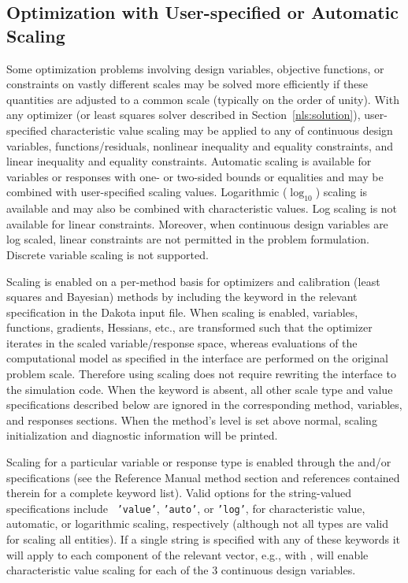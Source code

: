 \subsection{Optimization with User-specified or Automatic Scaling}
\label{opt:additional:scaling}

Some optimization problems involving design variables, objective
functions, or constraints on vastly different scales may be solved
more efficiently if these quantities are adjusted to a common scale
(typically on the order of unity). With any optimizer (or least
squares solver described in Section~\ref{nls:solution}),
user-specified characteristic value scaling may be applied to any of
continuous design variables, functions/residuals, nonlinear inequality
and equality constraints, and linear inequality and equality
constraints. Automatic scaling is available for variables or responses
with one- or two-sided bounds or equalities and may be combined with
user-specified scaling values. Logarithmic ($\log_{10}$) scaling is
available and may also be combined with characteristic values. Log
scaling is not available for linear constraints. Moreover, when
continuous design variables are log scaled, linear constraints are not
permitted in the problem formulation. Discrete variable scaling is not
supported.

Scaling is enabled on a per-method basis for optimizers and
calibration (least squares and Bayesian) methods by including the
 keyword in the relevant 
specification in the Dakota input file. When scaling is enabled,
variables, functions, gradients, Hessians, etc., are transformed such
that the optimizer iterates in the scaled variable/response space,
whereas evaluations of the computational model as specified in the
interface are performed on the original problem scale. Therefore using
scaling does not require rewriting the interface to the simulation
code. When the  keyword is absent, all other scale
type and value specifications described below are ignored in the
corresponding method, variables, and responses sections. When the
method's  level is set above normal, scaling
initialization and diagnostic information will be printed.

Scaling for a particular variable or response type is enabled through
the  and/or  specifications
(see the Reference Manual method section and references contained
therein for a complete keyword list). Valid options for the
string-valued  specifications include {\tt
  'value'}, {\tt 'auto'}, or {\tt 'log'}, for characteristic value,
automatic, or logarithmic scaling, respectively (although not all
types are valid for scaling all entities). If a single string is
specified with any of these keywords it will apply to each component
of the relevant vector, e.g., with ,
 will enable characteristic value
scaling for each of the 3 continuous design variables.


